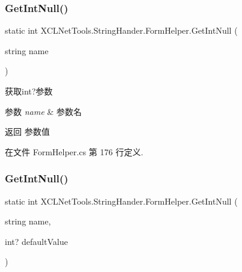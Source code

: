 \subsubsection{\texorpdfstring{Get\+Int\+Null()}{GetIntNull()}\hspace{0.1cm}{\footnotesize\ttfamily [1/2]}}
{\footnotesize\ttfamily static int X\+C\+L\+Net\+Tools.\+String\+Hander.\+Form\+Helper.\+Get\+Int\+Null (\begin{DoxyParamCaption}\item[{string}]{name }\end{DoxyParamCaption})\hspace{0.3cm}{\ttfamily [static]}}



获取int?参数 


\begin{DoxyParams}{参数}
{\em name} & 参数名\\
\hline
\end{DoxyParams}
\begin{DoxyReturn}{返回}
参数值
\end{DoxyReturn}


在文件 Form\+Helper.\+cs 第 176 行定义.

\mbox{\label{class_x_c_l_net_tools_1_1_string_hander_1_1_form_helper_a1516a7e8b32f2192c49bd2d2f754e11e}} 
\subsubsection{\texorpdfstring{Get\+Int\+Null()}{GetIntNull()}\hspace{0.1cm}{\footnotesize\ttfamily [2/2]}}
{\footnotesize\ttfamily static int X\+C\+L\+Net\+Tools.\+String\+Hander.\+Form\+Helper.\+Get\+Int\+Null (\begin{DoxyParamCaption}\item[{string}]{name,  }\item[{int?}]{default\+Value }\end{DoxyParamCaption})\hspace{0.3cm}{\ttfamily [static]}}



